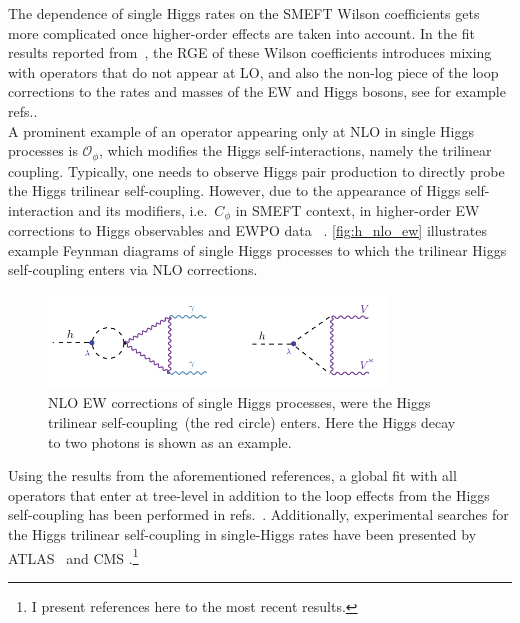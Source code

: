 \par The dependence of single Higgs rates on the SMEFT Wilson coefficients gets more complicated once higher-order effects are taken into account. In the fit results reported from~\cite{Dawson:2020oco}, the RGE of these Wilson coefficients introduces mixing with operators that do not appear at LO, and also the non-log piece of the loop corrections to the rates and masses of the EW and Higgs bosons, see for example refs.\cite{Passarino:2012cb,Degrassi:2016wml,Kribs:2017znd}. \\ A prominent example of an operator appearing only at NLO in single Higgs processes is $\mathcal O_\phi$, which modifies the Higgs self-interactions, namely the trilinear coupling. 
Typically, one needs to observe Higgs pair production to directly probe the Higgs trilinear self-coupling. However, due to the appearance of Higgs self-interaction and its modifiers, i.e.~$C_\phi$ in SMEFT context, in higher-order EW corrections to Higgs observables and EWPO data~ \cite{McCullough:2013rea, Gorbahn:2016uoy, Degrassi:2016wml, Bizon:2016wgr ,Kribs:2017znd,Maltoni:2017ims, Degrassi:2019yix, Degrassi:2021uik, Haisch:2021hvy}. \autoref{fig:h_nlo_ew} illustrates example Feynman diagrams of single Higgs processes to which the trilinear Higgs self-coupling enters via NLO corrections.
\begin{figure}[htpb!]
	\begin{center}
		\includegraphics[width=0.8\textwidth]{figures/htoaa_nlo_ew}
		\caption{NLO EW corrections of single Higgs processes,  were the Higgs trilinear self-coupling~(the red circle) enters. Here the Higgs decay to two photons is shown as an example. \label{fig:h_nlo_ew} }
	\end{center}
\end{figure}
Using the results from the aforementioned references, a global fit with all operators that enter at tree-level in addition to the loop effects from the Higgs self-coupling has been performed in refs.~\cite{DiVita:2017eyz,Dawson:2020oco}. Additionally, experimental searches for the Higgs trilinear self-coupling in single-Higgs rates have been presented by ATLAS~\cite{ATLAS:2019pbo} and CMS \cite{CMS:2020gsy}.\footnote{I present references here to the most recent results.} 
